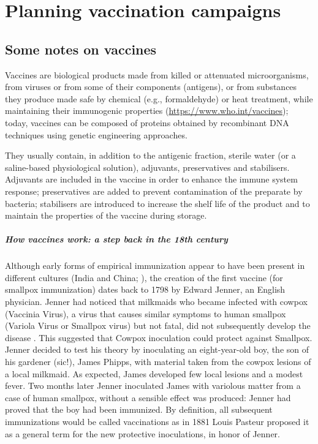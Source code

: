 \documentclass[graybox]{svmult}
\begin{document}
\section{Planning vaccination campaigns}
\label{planning}

\subsection{Some notes on vaccines}
\label{vaccineAction}

Vaccines are biological products made from killed or attenuated microorganisms, from viruses or from some of their components (antigens), or from substances they produce made safe by chemical (e.g., formaldehyde) or heat treatment, while maintaining their immunogenic properties (\href{https://www.who.int/vaccines}{https://www.who.int/vaccines}); today, vaccines can be composed of proteins obtained by recombinant DNA techniques using genetic engineering approaches.

They usually contain, in addition to the antigenic fraction, sterile water (or a saline-based physiological solution), adjuvants, preservatives and stabilisers. Adjuvants are included in the vaccine in order to enhance the immune system response; preservatives are added to prevent contamination of the preparate by bacteria; stabilisers are introduced to increase the shelf life of the product and to maintain the properties of the vaccine during storage.

\subparagraph{How vaccines work: a step back in the 18th century}
\label{hints}

Although early forms of empirical immunization appear to have been present in different cultures (India and China; \cite{Boylston2012}), the creation of the first vaccine (for smallpox immunization) dates back to 1798 by Edward Jenner, an English physician. Jenner had noticed that milkmaids who became infected with cowpox (Vaccinia Virus), a virus that causes similar symptoms to human smallpox (Variola Virus or Smallpox virus) but not fatal, did not subsequently develop the disease \cite{jenner1802}. This suggested that Cowpox inoculation could protect against Smallpox. Jenner decided to test his theory by inoculating an eight-year-old boy, the son of his gardener (sic!), James Phipps, with material taken from the cowpox lesions of a local milkmaid. As expected, James developed few local lesions and a modest fever. Two months later Jenner inoculated James with variolous matter from a case of human smallpox,  without a sensible effect was produced: Jenner had proved that the boy had been immunized. By definition, all subsequent immunizations would be called vaccinations as in 1881 Louis Pasteur proposed it as a general term for the new protective inoculations, in honor of Jenner.
 
\end{document}
